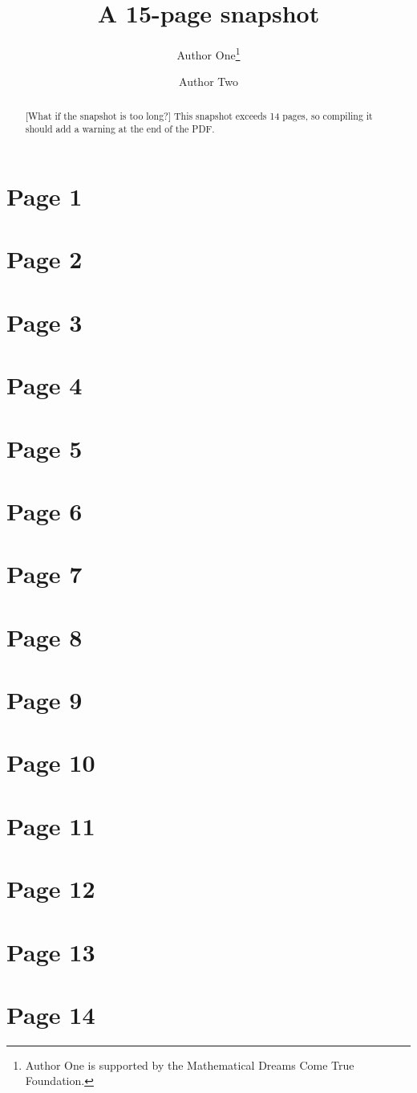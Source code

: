 \documentclass{snapshotmfo}
\author{Author One\thanks{Author One is supported by the Mathematical Dreams Come True Foundation.} \and Author Two}
\title{A 15-page snapshot}
\begin{document}

\begin{abstract}[What if the snapshot is too long?]
    This snapshot exceeds 14 pages, so compiling it should add a warning at the end of the PDF.
\end{abstract}

\section{Page 1}
\newpage\section{Page 2}
\newpage\section{Page 3}
\newpage\section{Page 4}
\newpage\section{Page 5}
\newpage\section{Page 6}
\newpage\section{Page 7}
\newpage\section{Page 8}
\newpage\section{Page 9}
\newpage\section{Page 10}
\newpage\section{Page 11}
\newpage\section{Page 12}
\newpage\section{Page 13}
\newpage\section{Page 14}
\end{document}
